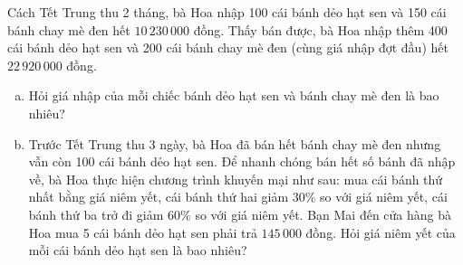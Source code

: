\begin{bt}%
Cách Tết Trung thu 2 tháng, bà Hoa nhập 100 cái bánh dẻo hạt sen và 150 cái bánh chay mè đen hết $10\,230\,000$ đồng. Thấy bán được, bà Hoa nhập thêm 400 cái bánh dẻo hạt sen và 200 cái bánh chay mè đen (cùng giá nhập đợt đầu) hết $22\,920\,000$ đồng.
\begin{enumerate}[a)]
    \item Hỏi giá nhập của mỗi chiếc bánh dẻo hạt sen và bánh chay mè đen là bao nhiêu?
    \item Trước Tết Trung thu 3 ngày, bà Hoa đã bán hết bánh chay mè đen nhưng vẫn còn 100 cái bánh dẻo hạt sen. Để nhanh chóng bán hết số bánh đã nhập về, bà Hoa thực hiện chương trình khuyến mại như sau: mua cái bánh thứ nhất bằng giá niêm yết, cái bánh thứ hai giảm $30\%$ so với giá niêm yết, cái bánh thứ ba trở đi giảm $60\%$ so với giá niêm yết. Bạn Mai đến cửa hàng bà Hoa mua 5 cái bánh dẻo hạt sen phải trả $145\,000$ đồng. Hỏi giá niêm yết của mỗi cái bánh dẻo hạt sen là bao nhiêu?
\end{enumerate}
\end{bt}
